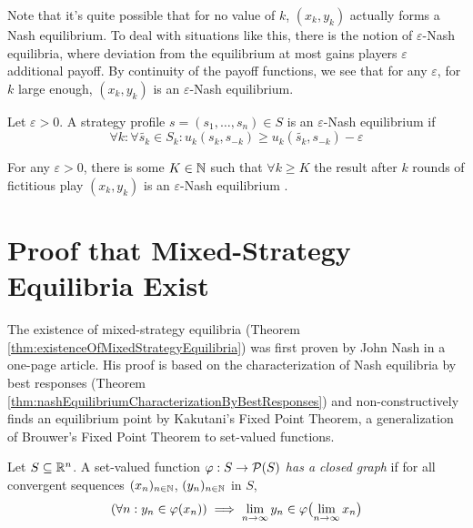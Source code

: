 \documentclass[a4paper]{scrreprt}
\let\epsilon\varepsilon
\let\phi\varphi
\begin{document}
    Note that it's quite possible that for no value of $k$, $(x_k, y_k)$ actually forms a Nash equilibrium.
    To deal with situations like this, there is the notion of $\epsilon$-Nash equilibria, where deviation from the equilibrium at most gains players $\epsilon$ additional payoff. %
    By continuity of the payoff functions, we see that for any $\epsilon$, for $k$ large enough, $(x_k, y_k)$ is an $\epsilon$-Nash equilibrium.
    
    \begin{defn}
        Let $\epsilon > 0$.
        A strategy profile $s = (s_1, \dots, s_n) \in S$ is an $\epsilon$-Nash equilibrium if
        \[
            \forall k: \forall \tilde{s_k} \in S_k: u_k(s_k, s_{-k}) \geq u_k(\tilde{s_k}, s_{-k}) - \epsilon
        \]
    \end{defn}

    \begin{cor}
        For any $\epsilon > 0$, there is some $K \in \mathbb{N}$ such that $\forall k \geq K$ the result after $k$ rounds of fictitious play $(x_k, y_k)$ is an $\epsilon$-Nash equilibrium .
    \end{cor}

    
    \section{Proof that Mixed-Strategy Equilibria Exist}
    \label{sec:existenceOfMixedStrategyEquilibria}
    The existence of mixed-strategy equilibria (Theorem \ref{thm:existenceOfMixedStrategyEquilibria}) was first proven by John Nash in a one-page article. %
    His proof is based on the characterization of Nash equilibria by best responses (Theorem \ref{thm:nashEquilibriumCharacterizationByBestResponses}) and non-constructively finds an equilibrium point by Kakutani's Fixed Point Theorem, a generalization of Brouwer's Fixed Point Theorem to set-valued functions.
    
    \begin{defn}
        Let $S \subseteq \mathbb{R}^n$. A set-valued function $\phi: S \to \Pot(S)$ \emph{has a closed graph} if for all convergent sequences $(x_n)_{n \in \mathbb{N}}$, $(y_n)_{n \in \mathbb{N}}$ in $S$,
        \[
            (\forall n: y_n \in \phi(x_n)) \implies \liminfty{n} y_n \in \phi\bigpars{\liminfty{n} x_n}
        \]
    \end{defn}
\end{document}
